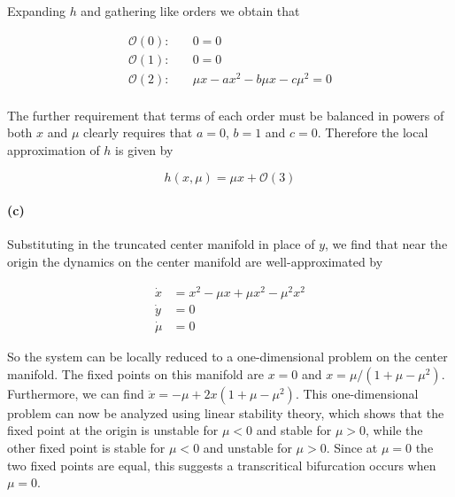 \documentclass{article}
\begin{document}
Expanding $h$ and gathering like orders we obtain that

\begin{align*}
	\mathcal{O}(0): &\quad 0 = 0 \\
	\mathcal{O}(1): &\quad 0 = 0 \\
	\mathcal{O}(2): &\quad \mu x - ax^2 - b\mu x - c\mu^2 = 0 \\
\end{align*}

The further requirement that terms of each order must be balanced in powers of both $x$ and $\mu$ 
clearly requires that $a = 0$, $b=1$ and $c=0$. Therefore the local approximation of $h$ is given 
by 

\begin{equation*}
	h(x,\mu) = \mu x + \mathcal{O}(3)
\end{equation*}

\paragraph{(c)}
Substituting in the truncated center manifold in place of $y$, we find that near the origin the 
dynamics on the center manifold are well-approximated by 

\begin{align*}
	\dot x &= x^2 - \mu x + \mu x^2 - \mu^2 x^2 \\
	\dot y &= 0 \\
	\dot \mu &= 0
\end{align*}

So the system can be locally reduced to a one-dimensional problem on the center manifold. 
The fixed points on this manifold are $x = 0$ and $x = \mu/(1+\mu-\mu^2)$. Furthermore, we 
can find $\ddot x = -\mu + 2x(1+\mu-\mu^2)$. This one-dimensional problem can now be analyzed 
using linear stability theory, which shows that the fixed point at the origin is unstable for 
$\mu < 0$ and stable for $\mu > 0$, while the other fixed point is stable for $\mu < 0$ and 
unstable for $\mu > 0$. Since at $\mu = 0$ the two fixed points are equal, this suggests a 
transcritical bifurcation occurs when $\mu = 0$. 
\end{document}
